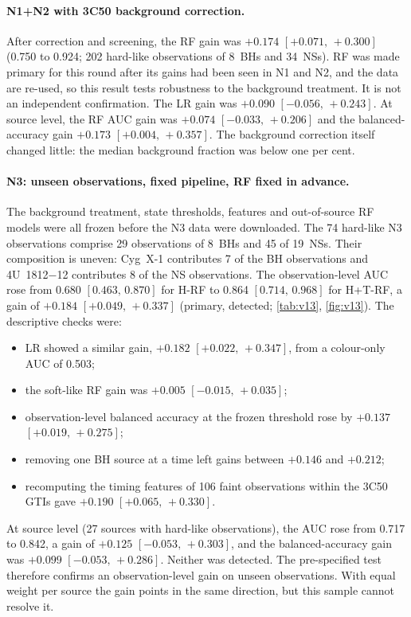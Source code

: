 \documentclass[11pt,a4paper]{article}
\newcommand{\ci}[2]{$[#1,\,#2]$}
\newcommand{\Hcol}{\textsf{H}}
\newcommand{\HT}{\textsf{H+T}}
\begin{document}
\paragraph{N1+N2 with 3C50 background correction.}
After correction and screening, the RF gain was $+0.174$ \ci{+0.071}{+0.300} (0.750 to 0.924; 202 hard-like observations
of 8~BHs and 34~NSs). RF was made primary for this round after its gains had been seen in N1 and N2, and the data are
re-used, so this result tests robustness to the background treatment. It is not an independent confirmation. The LR gain
was $+0.090$ \ci{-0.056}{+0.243}. At source level, the RF AUC gain was $+0.074$ \ci{-0.033}{+0.206} and the balanced-accuracy
gain $+0.173$ \ci{+0.004}{+0.357}. The background correction itself changed little: the median background fraction was
below one per cent.

\paragraph{N3: unseen observations, fixed pipeline, RF fixed in advance.}
The background treatment, state thresholds, features and out-of-source RF models were all frozen before the N3 data were
downloaded. The 74 hard-like N3 observations comprise 29 observations of 8~BHs and 45 of 19~NSs. Their composition is
uneven: Cyg~X-1 contributes 7 of the BH observations and 4U~1812$-$12 contributes 8 of the NS observations. The
observation-level AUC rose from 0.680 \ci{0.463}{0.870} for \Hcol-RF to 0.864 \ci{0.714}{0.968} for \HT-RF, a gain of
$+0.184$ \ci{+0.049}{+0.337} (primary, detected; \cref{tab:v13}, \cref{fig:v13}). The descriptive checks were:
\begin{itemize}\setlength\itemsep{1pt}
\item LR showed a similar gain, $+0.182$ \ci{+0.022}{+0.347}, from a colour-only AUC of 0.503;
\item the soft-like RF gain was $+0.005$ \ci{-0.015}{+0.035};
\item observation-level balanced accuracy at the frozen threshold rose by $+0.137$ \ci{+0.019}{+0.275};
\item removing one BH source at a time left gains between $+0.146$ and $+0.212$;
\item recomputing the timing features of 106 faint observations within the 3C50 GTIs gave $+0.190$ \ci{+0.065}{+0.330}.
\end{itemize}
At source level (27 sources with hard-like observations), the AUC rose from 0.717 to 0.842, a gain of $+0.125$
\ci{-0.053}{+0.303}, and the balanced-accuracy gain was $+0.099$ \ci{-0.053}{+0.286}. Neither was detected. The
pre-specified test therefore confirms an observation-level gain on unseen observations. With equal weight per source the
gain points in the same direction, but this sample cannot resolve it.
\end{document}
